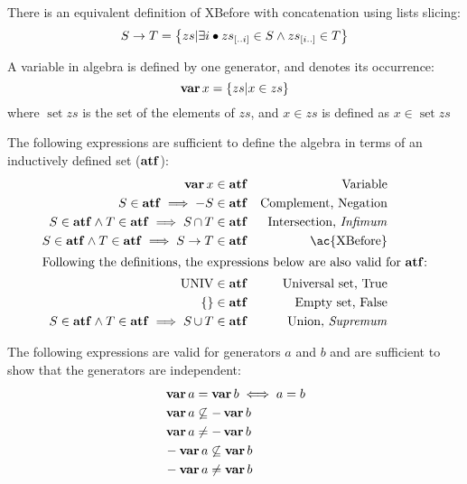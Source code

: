 \documentclass[12pt,openright,twoside,a4paper,oldfontcommands,english,brazil,final]{abntex2}
\theoremstyle{theo}
\newcommand{\sliceright}[2]{\ensuremath #1_{\left[..#2\right]}}
\newcommand{\sliceleft}[2]{\ensuremath #1_{\left[#2..\right]}}
\def\varop{\ensuremath\operatorname{\mathbf{var}}}
\newcommand{\var}[1]{\ensuremath\varop #1}
\def\xbeforeop{\ensuremath\rightarrow}
\newcommand{\xbefore}[2]{\ensuremath #1 \xbeforeop #2 }
\def\True{\ensuremath\operatorname{UNIV}}
\def\False{\ensuremath\operatorname{\left\{\right\}}}
\def\algebraset{\ensuremath\mathbf{atf}}
\newcommand{\setsin}[1]{\ensuremath\left\{ #1 \right\}}
\def\union{\ensuremath\operatorname{\cup}}
\def\inter{\ensuremath\operatorname{\cap}}
\begin{document}
There is an equivalent definition of \ac{XBefore} with concatenation using lists slicing:
%
\begin{equation}
\label{def:xbefore-slice}
\xbefore{S}{T} =
  \setsin{
    zs | \exists i \bullet \sliceright{zs}{i} \in S \land \sliceleft{zs}{i} \in T
  }
\end{equation}

A variable in \ac{algebra} is defined by one generator, and denotes its occurrence:
%
\begin{equation}
\label{def:var}
\var{x} =
  \setsin{
    zs | x \in zs
  }
\end{equation}
%
where $\mathop{set}zs$ is the set of the elements of $zs$, and $x \in zs$ is defined as $x \in \mathop{set} zs$

The following expressions are sufficient to define the \ac{algebra} in terms of an inductively defined set ($\algebraset$):
%
\begin{subequations}
\label{def:algebraset}
\begin{align}
\var x & \in \algebraset & \text{Variable}\label{def:algebraset-var}\\
S \in \algebraset \implies -S & \in \algebraset & \text{Complement, Negation}\label{def:algebraset-compl}\\
S \in \algebraset \land T \in \algebraset \implies S \inter T & \in \algebraset & \text{Intersection, \emph{Infimum}}\label{def:algebraset-inf}\\
S \in \algebraset \land T \in \algebraset \implies \xbefore{S}{T} & \in \algebraset & \text{\ac{XBefore}}\label{def:algebraset-xbefore}\\
\intertext{Following the definitions, the expressions below are also valid for $\algebraset$:}
\True &\in \algebraset & \text{Universal set, True}\label{def:algebraset-true}\\
\False &\in \algebraset & \text{Empty set, False}\label{def:algebraset-false}\\
S \in \algebraset \land T \in \algebraset \implies S \union T &\in \algebraset & \text{Union, \emph{Supremum}}\label{def:algebraset-sup}
\end{align}
\end{subequations}

The following expressions are valid for generators $a$ and $b$ and are sufficient to show that the generators are independent:
%
\begin{subequations}
\label{eqs:generators-independence}
\begin{align}
&\var a = \var b \iff a = b\\
&\var a \not\subseteq - \var b\\
&\var a \neq -\var b\label{eqs:generators-independence-subseteq-neq-compl} \\
&- \var a \not\subseteq \var b\\
&- \var a \neq \var b\label{eqs:generators-independence-subseteq-compl-neq}
\end{align}
\end{subequations}
\end{document}
